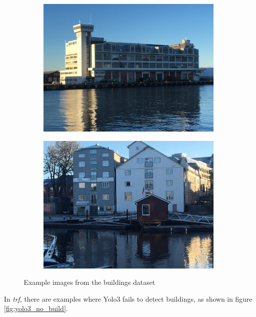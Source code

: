 \begin{figure}[h!]
\begin{subfigure}{.5\textwidth}
  \centering
  \includegraphics[width=0.8\linewidth]{discussion/buildings/IMG_2136.jpg}
\end{subfigure}%
\begin{subfigure}{.5\textwidth}
  \centering
  \includegraphics[width=.8\linewidth]{discussion/buildings/IMG_2085.jpg}
\end{subfigure}
\caption{Example images from the buildings dataset}
\label{fig:buildings}
\end{figure}

In \textit{trf}, there are examples where Yolo3 fails to detect buildings, as shown in figure \ref{fig:yolo3_no_build}.

